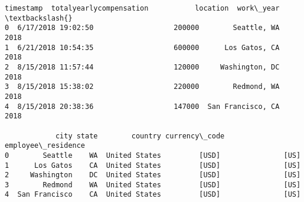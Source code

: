 \documentclass[11pt]{article}
\begin{document}
    \begin{Verbatim}[commandchars=\\\{\}]
            timestamp  totalyearlycompensation           location  work\_year  \textbackslash{}
0  6/17/2018 19:02:50                   200000        Seattle, WA       2018
1  6/21/2018 10:54:35                   600000      Los Gatos, CA       2018
2  8/15/2018 11:57:44                   120000     Washington, DC       2018
3  8/15/2018 15:38:02                   220000        Redmond, WA       2018
4  8/15/2018 20:38:36                   147000  San Francisco, CA       2018

            city state        country currency\_code employee\_residence
0        Seattle    WA  United States         [USD]               [US]
1      Los Gatos    CA  United States         [USD]               [US]
2     Washington    DC  United States         [USD]               [US]
3        Redmond    WA  United States         [USD]               [US]
4  San Francisco    CA  United States         [USD]               [US]
    \end{Verbatim}
\end{document}
